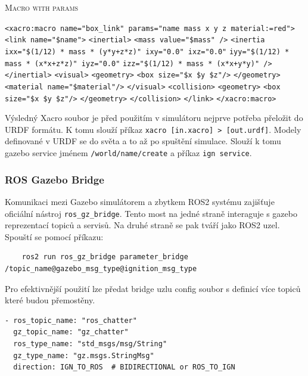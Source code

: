 \begin{algorithm}[h!]
	\label{}
	\caption{\textsc{Macro with params}}
	
	\DontPrintSemicolon
	\SetAlgoNoLine
	\SetNlSty{}{}{:}
	\SetNlSkip{-1.1em}
	
	\BlankLine \Indp\Indpp
	
	\texttt{<xacro:macro name="box\_link" params="name mass x y z material:=red">}\;
	\Indp\Indp
	\texttt{<link name="\${name}">}\;
	\Indp\Indp
	\texttt{<inertial>}\;
	\Indp\Indp
	\texttt{<mass value="\${mass}" />}\;
	\texttt{<inertia ixx="\${(1/12) * mass * (y*y+z*z)}" ixy="0.0" ixz="0.0"}\;
	\Indp\Indp
	\texttt{iyy="\${(1/12) * mass * (x*x+z*z)}" iyz="0.0"}\;
	\texttt{izz="\${(1/12) * mass * (x*x+y*y)}" />}\;
	\Indm\Indm
	\Indm\Indm
	\texttt{</inertial>}\;
	\texttt{<visual>}\;
	\Indp\Indp
	\texttt{<geometry>}\;	
	\Indp\Indp
	\texttt{<box size="\${x} \${y} \${z}"/>}\;
	\Indm\Indm
	\texttt{</geometry>}\;
	\texttt{<material name="\${material}"/>}\;
	\Indm\Indm
	\texttt{</visual>}\;
	\texttt{<collision>}\;
	\Indp\Indp
	\texttt{<geometry>}\;
	\Indp\Indp
	\texttt{<box size="\${x} \${y} \${z}"/>}\;
	\Indm\Indm
	\texttt{</geometry>}\;
	\Indm\Indm
	\texttt{</collision>}\;
	\Indm\Indm
	\texttt{</link>}\;
	\Indm\Indm
	\texttt{</xacro:macro>}\;
	
\end{algorithm}

Výsledný Xacro soubor je před použitím v simulátoru nejprve potřeba přeložit do URDF formátu. K tomu slouží příkaz \verb|xacro [in.xacro] > [out.urdf]|. Modely definované v URDF se do světa  a to až po spuštění simulace. Slouží k tomu gazebo service jménem \verb|/world/name/create| a příkaz \verb|ign service|. 

\subsubsection*{ROS Gazebo Bridge}
Komunikaci mezi Gazebo simulátorem a zbytkem ROS2 systému zajišťuje oficiální nástroj \verb|ros_gz_bridge|. Tento most na jedné straně interaguje s gazebo reprezentací topiců a servisů. Na druhé straně se pak tváří jako ROS2 uzel. Spouští se pomocí příkazu:
\begin{verbatim}
	ros2 run ros_gz_bridge parameter_bridge /topic_name@gazebo_msg_type@ignition_msg_type
\end{verbatim}
Pro efektivnější použití lze předat bridge uzlu config soubor s definicí více topiců které budou přemostěny.
\begin{verbatim}
- ros_topic_name: "ros_chatter"
  gz_topic_name: "gz_chatter"
  ros_type_name: "std_msgs/msg/String"
  gz_type_name: "gz.msgs.StringMsg"
  direction: IGN_TO_ROS  # BIDIRECTIONAL or ROS_TO_IGN
\end{verbatim}

